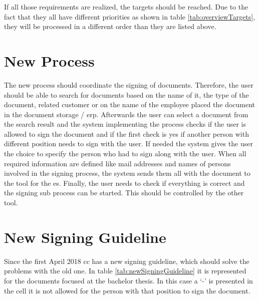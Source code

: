  If all those requirements are realized, the targets should be reached. Due to the fact that they all have different priorities as shown in table \ref{tab:overviewTargets}, they will be processed in a different order than they are listed above.

\section{New Process}
The new process should coordinate the signing of documents. Therefore, the user should be able to search for documents based on the name of it, the type of the document, related customer or on the name of the employee placed the document in the document storage / \gls{erp}. Afterwards the user can select a document from the search result and the system implementing the process checks if the user is allowed to sign the document and if the first check is yes if another person with different position needs to sign with the user. If needed the system gives the user the choice to specify the person who had to sign along with the user. When all required information are defined like mail addresses and names of persons involved in the signing process, the system sends them all with the document to the tool for the \gls{es}. Finally, the user needs to check if everything is correct and the signing sub process can be started. This should be controlled by the other tool. 

\section{New Signing Guideline}
Since the first April 2018 \gls{cc} has a new signing guideline, which should solve the problems with the old one. In table \ref{tab:newSigningGuideline} it is represented for the documents focused at the bachelor thesis. In this case a `-' is presented in the cell it is not allowed for the person with that position to sign the document.

